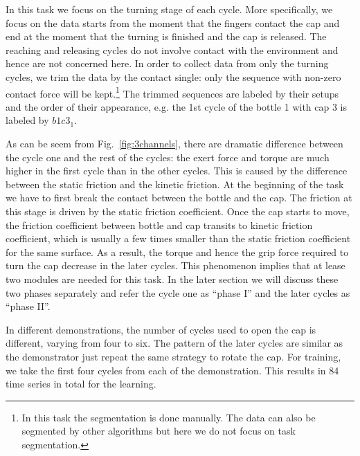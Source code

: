 In this task we focus on the turning stage of each cycle. More specifically, we focus on the data starts from the moment that the fingers contact the cap and end at the moment that the turning is finished and the cap is released. The reaching and releasing cycles do not involve contact with the environment and hence are not concerned here.
In order to collect data from only the turning cycles, we trim the data by the contact single: only the sequence with non-zero contact force will be kept.\footnote{In this task the segmentation is done manually. The data can also be segmented by other algorithms but here we do not focus on task segmentation.} The trimmed sequences are labeled by their setups and the order of their appearance, e.g. the 1st cycle of the bottle 1 with cap 3 is labeled by $b1c3_1$.

As can be seem from Fig.~\ref{fig:3channels}, there are dramatic difference between the cycle one and the rest of the cycles: the exert force and torque are much higher in the first cycle than in the other cycles. This is caused by the difference between the static friction and the kinetic friction. At the beginning of the task we have to first break the contact between the bottle and the cap. The friction at this stage is driven by the static friction coefficient. Once the cap starts to move, the friction coefficient between bottle and cap transits to kinetic friction coefficient, which is usually a few times smaller than the static friction coefficient for the same surface. As a result, the torque and hence the grip force required to turn the cap decrease in the later cycles. This phenomenon implies that at lease two modules are needed for this task. In the later section we will discuss these two phases separately and refer the cycle one as ``phase I'' and the later cycles as ``phase II''.

In different demonstrations, the number of cycles used to open the cap is different, varying from four to six. The pattern of the later cycles  are similar as the demonstrator just repeat the same strategy to rotate the cap. For training, we take the first four cycles from each of the demonstration. This results in 84 time series in total for the learning.

